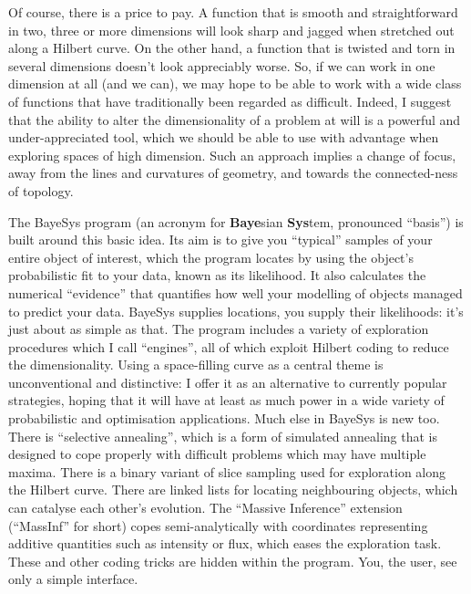 Of course, there is a price to pay.
A function that is smooth and straightforward in two, three or more dimensions will look sharp and jagged when stretched out along a Hilbert curve.
On the other hand, a function that is twisted and torn in several dimensions doesn't look appreciably worse.
So, if we can work in one dimension at all (and we can), we may hope to be able to work with a wide class of functions that have traditionally been regarded as difficult.
Indeed, I suggest that the ability to alter the dimensionality of a problem at will is a powerful and under-appreciated tool, 
which we should be able to use with advantage when exploring spaces of high dimension.
Such an approach implies a change of focus, away from the lines and curvatures of geometry, and towards the connected-ness of topology.

The BayeSys program (an acronym for {\bf Baye}sian {\bf Sys}tem, pronounced ``basis'') is built around this basic idea.
Its aim is to give you ``typical'' samples of your entire object of interest, 
which the program locates by using the object's probabilistic fit to your data, known as its likelihood.
It also calculates the numerical ``evidence'' that quantifies how well your modelling of objects managed to predict your data.
BayeSys supplies locations, you supply their likelihoods: it's just about as simple as that.
The program includes a variety of exploration procedures which I call ``engines'', all of which exploit Hilbert coding to reduce the dimensionality.
Using a space-filling curve as a central theme is unconventional and distinctive: 
I offer it as an alternative to currently popular strategies, 
hoping that it will have at least as much power in a wide variety of probabilistic and optimisation applications.
Much else in BayeSys is new too.
There is ``selective annealing'', 
which is a form of simulated annealing that is designed to cope properly with difficult problems which may have multiple maxima.
There is a binary variant of slice sampling used for exploration along the Hilbert curve.
There are linked lists for locating neighbouring objects, which can catalyse each other's evolution.
The ``Massive Inference'' extension (``MassInf'' for short) copes semi-analytically with coordinates representing additive quantities such as intensity or flux, 
which eases the exploration task.
These and other coding tricks are hidden within the program.
You, the user, see only a simple interface.

